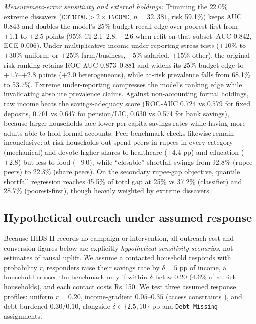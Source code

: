 \documentclass[conference]{IEEEtran}
\newcommand{\rs}{Rs.\,}
\begin{document}
\emph{Measurement-error sensitivity and external holdings:} Trimming the 22.0\% extreme dissavers ($\texttt{COTOTAL} > 2 \times \texttt{INCOME}$, $n=32{,}381$, risk 59.1\%) keeps AUC 0.843 and doubles the model's 25\%-budget recall edge over poorest-first from $+1.1$ to $+2.5$ points (95\% CI 2.1--2.8; $+2.6$ when refit on that subset, AUC 0.842, ECE 0.006). Under multiplicative income under-reporting stress tests ($+10\%$ to $+30\%$ uniform, or $+25\%$ farm/business, $+5\%$ salaried, $+15\%$ other), the original risk ranking retains ROC-AUC 0.873--0.881 and widens its 25\%-budget edge to $+1.7$--$+2.8$ points ($+2.0$ heterogeneous), while at-risk prevalence falls from 68.1\% to 53.7\%. Extreme under-reporting compresses the model's ranking edge while invalidating absolute prevalence claims. Against non-accounting formal holdings, raw income beats the savings-adequacy score (ROC-AUC 0.724 vs 0.679 for fixed deposits, 0.701 vs 0.647 for pension/LIC, 0.630 vs 0.574 for bank savings), because larger households face lower per-capita savings rates while having more adults able to hold formal accounts. Peer-benchmark checks likewise remain inconclusive: at-risk households out-spend peers in rupees in every category (mechanical) and devote higher shares to healthcare ($+4.4$ pp) and education ($+2.8$) but less to food ($-9.0$), while ``closable'' shortfall swings from 92.8\% (rupee peers) to 22.3\% (share peers). On the secondary rupee-gap objective, quantile shortfall regression reaches 45.5\% of total gap at 25\% vs 37.2\% (classifier) and 28.7\% (poorest-first), though heavily weighted by extreme dissavers.

\subsection{Hypothetical outreach under assumed response}

Because IHDS-II records no campaign or intervention, all outreach cost and conversion figures below are explicitly \emph{hypothetical sensitivity scenarios}, not estimates of causal uplift. We assume a contacted household responds with probability $r$, responders raise their savings rate by $\delta = 5$ pp of income, a household crosses the benchmark only if within $\delta$ below 0.20 (4.6\% of at-risk households), and each contact costs \rs 150. We test three assumed response profiles: uniform $r=0.20$, income-gradient $0.05\text{--}0.35$ (access constraints \cite{dupas2013}), and debt-burdened $0.30/0.10$, alongside $\delta \in \{2.5, 10\}$ pp and \texttt{Debt\_Missing} assignments.
\end{document}
